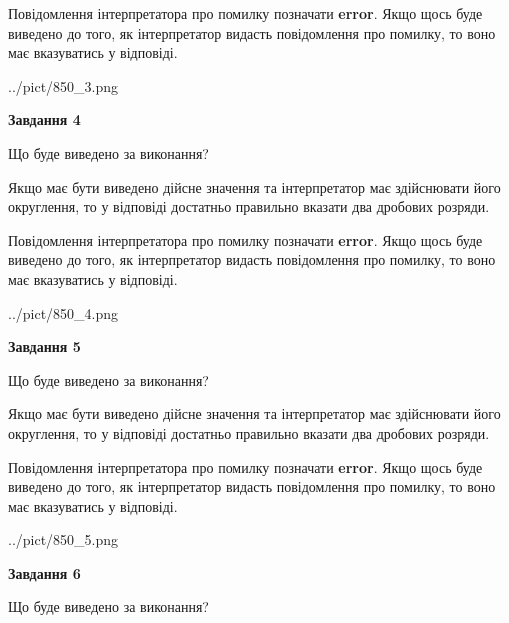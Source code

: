 \documentclass[12pt, ukrainian]{article}
\begin{document}
{\begin {Large}
Повідомлення інтерпретатора про помилку позначати \textbf{error}.
Якщо щось буде виведено до того, як інтерпретатор видасть повідомлення про помилку, 
то воно має вказуватись у відповіді. \par

\begin{center}
	{../pict/850_3.png}
\end{center}
\newpage

{\begin {center}\textbf{Завдання 4}\end {center}}\par
Що буде виведено за виконання? \par

Якщо має бути виведено дійсне значення та інтерпретатор має здійснювати його округлення, 
то у відповіді достатньо правильно вказати два дробових розряди.

Повідомлення інтерпретатора про помилку позначати \textbf{error}.
Якщо щось буде виведено до того, як інтерпретатор видасть повідомлення про помилку, 
то воно має вказуватись у відповіді. \par

\begin{center}
	{../pict/850_4.png}
\end{center}
\newpage

{\begin {center}\textbf{Завдання 5}\end {center}}\par
Що буде виведено за виконання? \par

Якщо має бути виведено дійсне значення та інтерпретатор має здійснювати його округлення, 
то у відповіді достатньо правильно вказати два дробових розряди.

Повідомлення інтерпретатора про помилку позначати \textbf{error}.
Якщо щось буде виведено до того, як інтерпретатор видасть повідомлення про помилку, 
то воно має вказуватись у відповіді. \par

\begin{center}
	{../pict/850_5.png}
\end{center}
\newpage

{\begin {center}\textbf{Завдання 6}\end {center}}\par
Що буде виведено за виконання? \par


\end{Large}}
\end{document}
